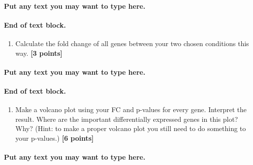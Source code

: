 \documentclass[
]{article}
\providecommand{\tightlist}{%
  \setlength{\itemsep}{0pt}\setlength{\parskip}{0pt}}
\begin{document}
\hypertarget{put-any-text-you-may-want-to-type-here.-8}{%
\paragraph{Put any text you may want to type
here.}\label{put-any-text-you-may-want-to-type-here.-8}}

\hypertarget{end-of-text-block.-10}{%
\paragraph{End of text block.}\label{end-of-text-block.-10}}

\begin{enumerate}
\def\labelenumi{\Alph{enumi})}
\setcounter{enumi}{4}
\tightlist
\item
  Calculate the fold change of all genes between your two chosen
  conditions this way. \textbf{{[}3 points{]}}
\end{enumerate}

\hypertarget{put-any-text-you-may-want-to-type-here.-9}{%
\paragraph{Put any text you may want to type
here.}\label{put-any-text-you-may-want-to-type-here.-9}}

\hypertarget{end-of-text-block.-11}{%
\paragraph{End of text block.}\label{end-of-text-block.-11}}

\begin{enumerate}
\def\labelenumi{\Alph{enumi})}
\setcounter{enumi}{5}
\tightlist
\item
  Make a volcano plot using your FC and p-values for every gene.
  Interpret the result. Where are the important differentially expressed
  genes in this plot? Why? (Hint: to make a proper volcano plot you
  still need to do something to your p-values.) \textbf{{[}6 points{]}}
\end{enumerate}

\hypertarget{put-any-text-you-may-want-to-type-here.-10}{%
\paragraph{\texorpdfstring{Put any text you may want to type here.\\
}{Put any text you may want to type here. }}\label{put-any-text-you-may-want-to-type-here.-10}}
\end{document}
